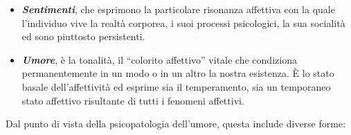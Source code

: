 \begin{itemize}
\item
  \textbf{\emph{Sentimenti}}, che esprimono la particolare risonanza
  affettiva con la quale l'individuo vive la realtà corporea, i suoi
  processi psicologici, la sua socialità ed sono piuttosto persistenti.
\item
  \textbf{\emph{Umore}}, è la tonalità, il ``colorito affettivo'' vitale
  che condiziona permanentemente in un modo o in un altro la nostra
  esistenza. È lo stato basale dell'affettività ed esprime sia il
  temperamento, sia un temporaneo stato affettivo risultante di tutti i
  fenomeni affettivi.
\end{itemize}

Dal punto di vista della psicopatologia dell'umore, questa include
diverse forme:

